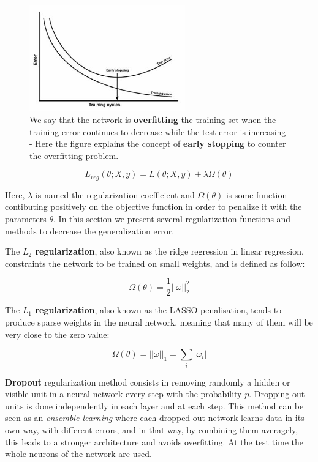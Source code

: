 \documentclass[master, tikz, final,11pt, dvipdfmx]{iscs-thesis}
\begin{document}
\begin{figure}[h]
\centering
\includegraphics[width=0.6\textwidth]{gen}
\caption[Generalization problem explanation]{We say that the network is \textbf{overfitting} the training set when the training error continues to decrease while the test error is increasing - Here the figure explains the concept of \textbf{early stopping} to counter the overfitting problem.}
\label{fig:gen} 
\end{figure}



\[
L_{reg}(\theta; X, y) = L(\theta; X, y) + \lambda \Omega(\theta)
\]

Here, $\lambda$ is named the regularization coefficient and $\Omega(\theta)$ is some function contibuting positively on the objective function in order to penalize it with the parameters $\theta$. In this section we present several regularization functions and methods to decrease the generalization error.

The \textbf{$L_2$ regularization}, also known as the ridge regression in linear regression, constraints the network to be trained on small weights, and is defined as follow:

\[
\Omega(\theta)= \frac{1}{2}|| \omega ||^2_2
\]

The \textbf{$L_1$ regularization}, also known as the LASSO penalisation, tends to produce sparse weights in the neural network, meaning that many of them will be very close to the zero value:

\[
\Omega(\theta)= || \omega ||_1=\sum_i|\omega_i|
\]

\textbf{Dropout} \cite{DO} regularization method consists in removing randomly a hidden or visible unit in a neural network every step with the probability $p$. Dropping out units is done independently in each layer and at each step. This method can be seen as an \textit{ensemble learning} where each dropped out network learns data in its own way, with different errors, and in that way, by combining them averagely, this leads to a stronger architecture and avoids overfitting. At the test time the whole neurons of the network are used.
\end{document}
